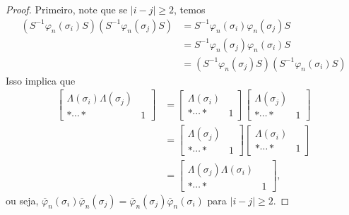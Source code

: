 	\begin{proof}
		Primeiro, note que se $|i-j|\geq 2$, temos
		\begin{align*}
    		(S^{-1}\varphi_n(\sigma_i)S)(S^{-1}\varphi_n(\sigma_j)S) 
    		&= S^{-1}\varphi_n(\sigma_i)\varphi_n(\sigma_j)S \\ 
    		&= S^{-1}\varphi_n(\sigma_j)\varphi_n(\sigma_i)S \\
    		&= (S^{-1}\varphi_n(\sigma_j)S)(S^{-1}\varphi_n(\sigma_i)S)
		\end{align*}
		Isso implica que
		\begin{align*}
    		\left[ \begin{array}{c|c}
    		\Lambda(\sigma_i)\Lambda(\sigma_j) & \\
    		\hline
    		\ast\cdots\ast & 1
    		\end{array}\right] &= 
    		\left[ \begin{array}{c|c}
    		\Lambda(\sigma_i) & \\
    		\hline
    		\ast\cdots\ast & 1
    		\end{array}\right]\left[ \begin{array}{c|c}
    		\Lambda(\sigma_j) & \\
    		\hline
    		\ast\cdots\ast & 1
    		\end{array}\right]  \\
    		&= \left[\begin{array}{c|c}
    		\Lambda(\sigma_j) & \\
    		\hline
    		\ast\cdots\ast & 1
    		\end{array}\right]\left[ \begin{array}{c|c}
    		\Lambda(\sigma_i) & \\
    		\hline
    		\ast\cdots\ast & 1
    		\end{array}\right] \\
    		&= \left[\begin{array}{c|c}
    		\Lambda(\sigma_j)\Lambda(\sigma_i) & \\
    		\hline
    		\ast\cdots\ast & 1
    		\end{array}\right],
		\end{align*}
		ou seja, 
		$\overline{\varphi}_n(\sigma_i)\overline{\varphi}_n(\sigma_j) =
		\overline{\varphi}_n(\sigma_j)\overline{\varphi}_n(\sigma_i)$ para $|i-j|\geq 2$.
		

\end{proof}
